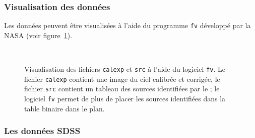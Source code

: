 		\subsubsection{Visualisation des données}

Les données peuvent être visualisées à l'aide du programme \texttt{fv} développé par la NASA (voir figure~\ref{fig:fv}).

	\begin{figure}[h]
	  \centering
	  \hspace{5pt}
	  \\
	  \caption[Visualisation des données avec \texttt{fv}]{Visualisation des fichiers \texttt{calexp} et \texttt{src} à l'aide du logiciel \texttt{fv}. Le fichier \texttt{calexp} contient une image du ciel calibrée et corrigée, le fichier \texttt{src} contient un tableau des sources identifiées par le \stack ; le logiciel \texttt{fv} permet de plus de placer les sources identifiées dans la table binaire dans le plan.}
	  \label{fig:fv}
	\end{figure}

		\subsubsection{Les données SDSS}

